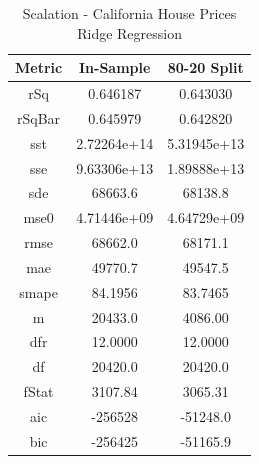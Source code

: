 \documentclass{article}
\begin{document}
\begin{table}[H]
\centering
\caption{Scalation - California House Prices Ridge Regression}
\label{tab:Scalation - House Prices Ridge Regression}
\begin{tabular}{|c|c|c|} \hline 
Metric & In-Sample & 80-20 Split \\ \hline \hline 
rSq &0.646187 & 0.643030 \\ \hline 
rSqBar &0.645979 &      0.642820 \\ \hline 
sst &2.72264e+14 &      5.31945e+13 \\ \hline 
sse &9.63306e+13 &      1.89888e+13 \\ \hline 
sde &68663.6 &  68138.8 \\ \hline 
mse0 &4.71446e+09 &     4.64729e+09 \\ \hline 
rmse &68662.0 & 68171.1 \\ \hline 
mae &49770.7 &  49547.5 \\ \hline 
smape &84.1956 &        83.7465 \\ \hline 
m &20433.0 &    4086.00 \\ \hline 
dfr &12.0000 &  12.0000 \\ \hline 
df &20420.0 &   20420.0 \\ \hline 
fStat &3107.84 &        3065.31 \\ \hline 
aic &-256528 &  -51248.0 \\ \hline 
bic &-256425 &  -51165.9 \\ \hline 
\end{tabular}
\end{table}
\end{document}
